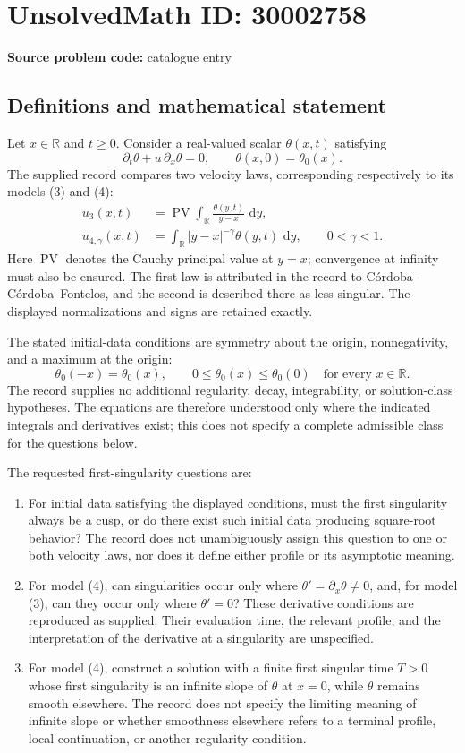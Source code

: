 \documentclass[11pt]{article}
\newcommand{\R}{\mathbb{R}}
\newcommand{\dd}{\,\mathrm{d}}
\begin{document}
\section*{UnsolvedMath ID: 30002758}
\textbf{Source problem code:} catalogue entry
\subsection{Definitions and mathematical statement}
Let \(x\in\R\) and \(t\geq0\). Consider a real-valued scalar \(\theta(x,t)\) satisfying
\[
\partial_t\theta+u\,\partial_x\theta=0,
\qquad \theta(x,0)=\theta_0(x).
\]
The supplied record compares two velocity laws, corresponding respectively to its models (3) and (4):
\begin{align*}
u_3(x,t)&=\operatorname{PV}\int_{\R}\frac{\theta(y,t)}{y-x}\,\dd y,
\\
u_{4,\gamma}(x,t)&=\int_{\R}|y-x|^{-\gamma}\theta(y,t)\,\dd y,
\qquad 0<\gamma<1.
\end{align*}
Here \(\operatorname{PV}\) denotes the Cauchy principal value at \(y=x\); convergence at infinity must also be ensured. The first law is attributed in the record to C\'ordoba--C\'ordoba--Fontelos, and the second is described there as less singular. The displayed normalizations and signs are retained exactly.

The stated initial-data conditions are symmetry about the origin, nonnegativity, and a maximum at the origin:
\[
\theta_0(-x)=\theta_0(x),\qquad
0\leq\theta_0(x)\leq\theta_0(0)
\quad\text{for every }x\in\R.
\]
The record supplies no additional regularity, decay, integrability, or solution-class hypotheses. The equations are therefore understood only where the indicated integrals and derivatives exist; this does not specify a complete admissible class for the questions below.

The requested first-singularity questions are:
\begin{enumerate}
\item For initial data satisfying the displayed conditions, must the first singularity always be a cusp, or do there exist such initial data producing square-root behavior? The record does not unambiguously assign this question to one or both velocity laws, nor does it define either profile or its asymptotic meaning.
\item For model (4), can singularities occur only where \(\theta'=\partial_x\theta\neq0\), and, for model (3), can they occur only where \(\theta'=0\)? These derivative conditions are reproduced as supplied. Their evaluation time, the relevant profile, and the interpretation of the derivative at a singularity are unspecified.
\item For model (4), construct a solution with a finite first singular time \(T>0\) whose first singularity is an infinite slope of \(\theta\) at \(x=0\), while \(\theta\) remains smooth elsewhere. The record does not specify the limiting meaning of infinite slope or whether smoothness elsewhere refers to a terminal profile, local continuation, or another regularity condition.
\end{enumerate}
\end{document}
